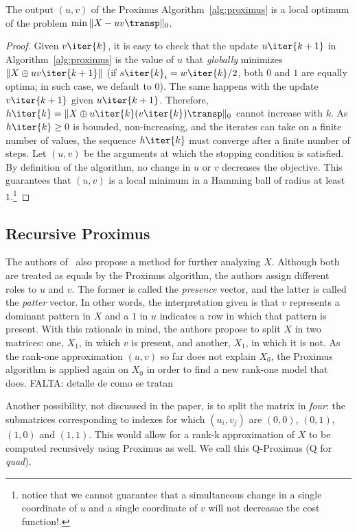 \documentclass[a4paper]{IEEEtran}
\begin{document}
\begin{proposition}
The output $(u,v)$ of the Proximus Algorithm~\ref{alg:proximus} is a local optimum of the problem $\min \|X - uv\transp\|_0$. 
\end{proposition}
\begin{proof}
 Given $v\iter{k}$, it is easy to check that the update $u\iter{k+1}$ in Algorithm~\ref{alg:proximus} is the value of $u$ that \emph{globally} minimizes $\|X \oplus uv\iter{k+1} \|$ (if $ s\iter{k}_i = w\iter{k}/2$, both $0$ and $1$ are equally optima; in such case, we default to $0$). The same happens with the update $v\iter{k+1}$ given $u\iter{k+1}$. Therefore, $h\iter{k}=\|X \oplus u\iter{k}(v\iter{k})\transp \|_0$ cannot increase with $k$. As $h\iter{k} \geq 0$ is bounded, non-increasing, and the iterates can take on a finite number of values, the sequence $h\iter{k}$ must converge  after a finite number of steps. Let $(u,v)$ be the arguments at which the stopping condition is satisfied. By definition of the algorithm, no change in $u$ or $v$ decreases the objective. This guarantees that $(u,v)$ is a local minimum in a Hamming ball of radius at least $1$.\footnote{notice that we cannot guarantee that a simultaneous change in a single coordinate of $u$ and a single coordinate of $v$ will not decreasae the cost function!.} 
\end{proof}

\subsection{Recursive Proximus}

The authors of~\cite{proximus} also propose a method for further analyzing $X$. Although both are treated as equals by the Proximus algorithm, the authors assign different roles to $u$ and $v$. The former is called the \emph{presence} vector, and the latter is called the \emph{patter} vector. In other words, the interpretation given is that $v$ represents a dominant pattern in $X$ and a $1$ in $u$ indicates a row in which that pattern is present. With this rationale in mind, the authors propose to split $X$ in two matrices: one, $X_1$, in which $v$ is present, and another, $X_1$, in which it is not. As the rank-one approximation $(u,v)$ so far does not explain $X_0$, the Proximus algorithm is applied again on $X_0$ in order to find a new rank-one model that does. 
FALTA: detalle de como se tratan

Another possibility, not discussed in the paper, is to split the matrix in \emph{four}: the submatrices corresponding to indexes for which $(u_i,v_j)$ are $(0,0)$, $(0,1)$, $(1,0)$ and $(1,1)$. This would allow for a rank-k approximation of $X$ to be computed recursively using Proximus as well. We call this Q-Proximus (Q for \emph{quad}).
\end{document}
